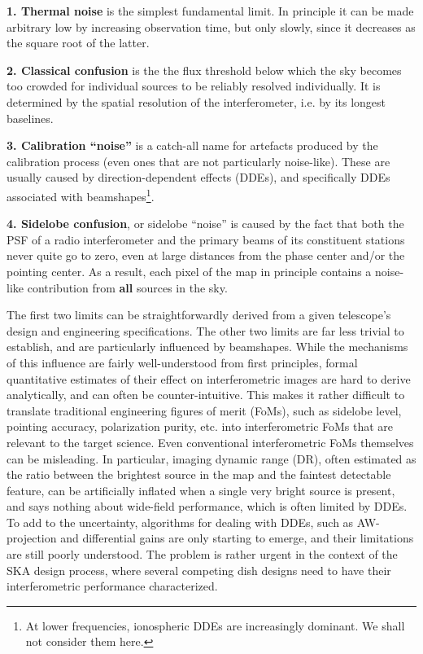\documentclass{aa}
\begin{document}
{\bf 1. Thermal noise} is the simplest fundamental limit. In principle it can be made arbitrary low by increasing observation time, but only slowly, since it decreases as the square root of the latter.

{\bf 2. Classical confusion} is the the flux threshold below which the sky becomes too crowded for individual sources to be reliably resolved individually. It is determined by the spatial resolution of the interferometer, i.e. by its longest baselines.

{\bf 3. Calibration ``noise''} is a catch-all name for artefacts produced by the calibration process (even ones that are not particularly noise-like). These are usually caused by direction-dependent effects (DDEs), and specifically DDEs associated with beamshapes\footnote{At lower frequencies, ionospheric DDEs are increasingly dominant. We shall not consider them here.}.

{\bf 4. Sidelobe confusion}, or sidelobe ``noise'' is caused by the fact that both the PSF of a radio interferometer and the primary beams of its constituent stations never quite go to zero, even at large distances from 
the phase center and/or the pointing center. As a result, each pixel of the map in principle contains a noise-like contribution from {\bf all} sources in the sky.

The first two limits can be straightforwardly derived from a given telescope's design and engineering specifications. The other two limits are far less trivial to establish, and are particularly influenced by beamshapes. While the mechanisms of this influence are fairly well-understood from first principles, formal quantitative estimates of their effect on interferometric images are hard to derive analytically, and can often be counter-intuitive. This makes it rather difficult to translate traditional engineering figures of merit (FoMs), such as sidelobe level, pointing accuracy, polarization purity, etc. into interferometric FoMs that are relevant to the target science. Even conventional interferometric FoMs themselves can be misleading. In particular, imaging dynamic range (DR), often estimated as the ratio between the brightest source in the map and the faintest detectable feature, can be artificially inflated when a single very bright source is present, and says nothing about wide-field  performance, which is often limited by DDEs. To add to the uncertainty, algorithms for dealing with DDEs, such as AW-projection \citep{SB:imageplane} and differential gains \citep{RRIME3} are only starting to emerge, and their limitations are still poorly understood. The problem is rather urgent in the context of the SKA design process, where several competing dish designs need to have their interferometric performance characterized.
\end{document}
